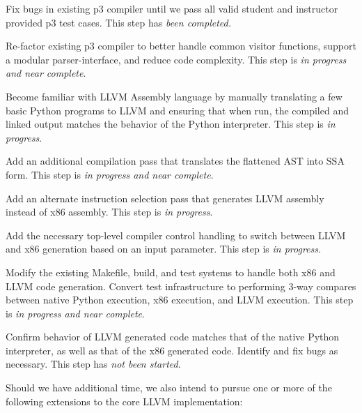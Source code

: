 \documentclass[11pt]{article}
\newenvironment{packed_enum}{
\begin{enumerate}
  \setlength{\itemsep}{1pt}
  \setlength{\parskip}{0pt}
  \setlength{\parsep}{0pt}
}{\end{enumerate}}
\begin{document}
\begin{packed_enum}
\item Fix bugs in existing p3 compiler until we pass all valid student
  and instructor provided p3 test cases. This step has \emph{been completed.}
\item Re-factor existing p3 compiler to better handle common visitor
  functions, support a modular parser-interface, and reduce code
  complexity. This step is \emph{in progress and near complete}.
\item Become familiar with LLVM Assembly language by manually
  translating a few basic Python programs to LLVM and ensuring that
  when run, the compiled and linked output matches the behavior of the
  Python interpreter. This step is \emph{in progress}.
\item Add an additional compilation pass that translates the flattened
  AST into SSA form. This step is \emph{in progress and near complete}.
\item Add an alternate instruction selection pass that generates LLVM
  assembly instead of x86 assembly. This step is \emph{in progress}.
\item Add the necessary top-level compiler control handling to switch
  between LLVM and x86 generation based on an input parameter. This
  step is \emph{in progress}.
\item Modify the existing Makefile, build, and test systems to handle
  both x86 and LLVM code generation. Convert test infrastructure to
  performing 3-way compares between native Python execution, x86
  execution, and LLVM execution. This step is \emph{in progress and near complete}.
\item Confirm behavior of LLVM generated code matches that of the
  native Python interpreter, as well as that of the x86 generated
  code. Identify and fix bugs as necessary. This step has \emph{not
    been started}.
\end{packed_enum}

Should we have additional time, we also intend to pursue one or more
of the following extensions to the core LLVM implementation:
\end{document}
